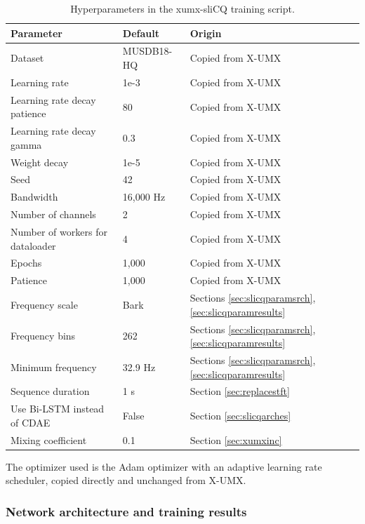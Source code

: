 \documentclass[report.tex]{subfiles}
\begin{document}
\begin{table}[ht]
	\centering
	\caption{Hyperparameters in the xumx-sliCQ training script.}
	\label{table:xumxslicqparams}
	\begin{tabular}{ |l|l|l| }
	 \hline
		Parameter & Default & Origin \\
	 \hline
	 \hline
		Dataset & MUSDB18-HQ & Copied from X-UMX \\
	 \hline
		Learning rate & 1e-3 & Copied from X-UMX \\
	 \hline
		Learning rate decay patience & 80 & Copied from X-UMX \\
	 \hline
		Learning rate decay gamma & 0.3 & Copied from X-UMX \\
	 \hline
		Weight decay & 1e-5 & Copied from X-UMX \\
	 \hline
	 	Seed & 42 & Copied from X-UMX \\
	 \hline
		Bandwidth & 16,000 Hz & Copied from X-UMX \\
	 \hline
	 	Number of channels & 2 & Copied from X-UMX \\
	 \hline
	 	Number of workers for dataloader & 4 & Copied from X-UMX \\
	 \hline
		Epochs & 1,000 & Copied from X-UMX \\
	 \hline
		Patience & 1,000 & Copied from X-UMX \\
	 \hline
		Frequency scale & Bark & Sections \ref{sec:slicqparamsrch}, \ref{sec:slicqparamresults} \\
	 \hline
		Frequency bins & 262 & Sections \ref{sec:slicqparamsrch}, \ref{sec:slicqparamresults} \\
	 \hline
	 	Minimum frequency & 32.9 Hz & Sections \ref{sec:slicqparamsrch}, \ref{sec:slicqparamresults} \\
	 \hline
		Sequence duration & 1 s & Section \ref{sec:replacestft} \\
	 \hline
		Use Bi-LSTM instead of CDAE & False & Section \ref{sec:slicqarches} \\
	 \hline
		Mixing coefficient & 0.1 & Section \ref{sec:xumxinc} \\
	 \hline
\end{tabular}
\end{table}

The optimizer used is the Adam optimizer with an adaptive learning rate scheduler, copied directly and unchanged from X-UMX.

\subsubsection{Network architecture and training results}
\label{sec:networktraining}
\end{document}
